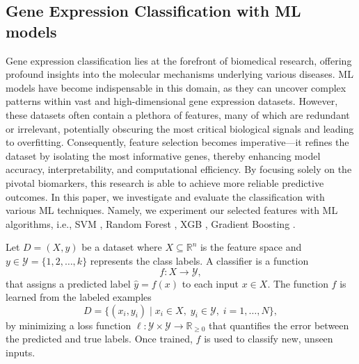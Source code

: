 \subsection{Gene Expression Classification with ML models}
Gene expression classification \cite{do2024enhancing,do2023ensemble,huynh2019novel} lies at the forefront of biomedical research, offering profound insights into the molecular mechanisms underlying various diseases. ML models have become indispensable in this domain, as they can uncover complex patterns within vast and high-dimensional gene expression datasets. However, these datasets often contain a plethora of features, many of which are redundant or irrelevant, potentially obscuring the most critical biological signals and leading to overfitting. Consequently, feature selection becomes imperative—it refines the dataset by isolating the most informative genes, thereby enhancing model accuracy, interpretability, and computational efficiency. By focusing solely on the pivotal biomarkers, this research is able to achieve more reliable predictive outcomes. In this paper, we investigate and evaluate the classification with various ML techniques. Namely, we experiment our selected features with ML algorithms, i.e., SVM \cite{vapnik1995support}, Random Forest \cite{breiman2001random}, XGB \cite{chen2015xgboost}, Gradient Boosting \cite{friedman2002stochastic}.

\begin{definition}[Classification]
Let \( D = (X, y) \) be a dataset where \( X \subseteq \mathbb{R}^n \) is the feature space and \( y \in \mathcal{Y} = \{1,2,\dots,k\} \) represents the class labels. A classifier is a function
\[
f: X \to \mathcal{Y},
\]
that assigns a predicted label \( \hat{y} = f(x) \) to each input \( x \in X \). The function \( f \) is learned from the labeled examples
\[
D = \{(x_i, y_i) \mid x_i \in X,\; y_i \in \mathcal{Y},\; i = 1, \dots, N\},
\]
by minimizing a loss function \( \ell: \mathcal{Y} \times \mathcal{Y} \to \mathbb{R}_{\ge 0} \) that quantifies the error between the predicted and true labels. Once trained, \( f \) is used to classify new, unseen inputs.
\end{definition}



